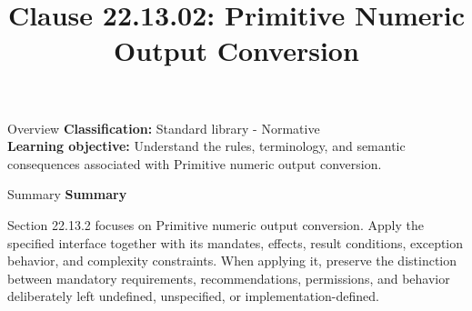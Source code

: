 \documentclass[10pt,letterpaper]{article}
\title{Clause 22.13.02: Primitive Numeric Output Conversion}
\author{}
\date{}
\begin{document}
\maketitle
\begin{CornellOverviewBox}{Overview}
\textbf{Classification:} Standard library - Normative\\[2pt]
\textbf{Learning objective:} Understand the rules, terminology, and semantic consequences associated with Primitive numeric output conversion.
\end{CornellOverviewBox}\begin{CornellSummaryBox}{Summary}
{\sffamily\bfseries\color{Accent} Summary}\par\vspace{3pt}Section 22.13.2 focuses on Primitive numeric output conversion. Apply the specified interface together with its mandates, effects, result conditions, exception behavior, and complexity constraints. When applying it, preserve the distinction between mandatory requirements, recommendations, permissions, and behavior deliberately left undefined, unspecified, or implementation-defined.
\end{CornellSummaryBox}
\end{document}
